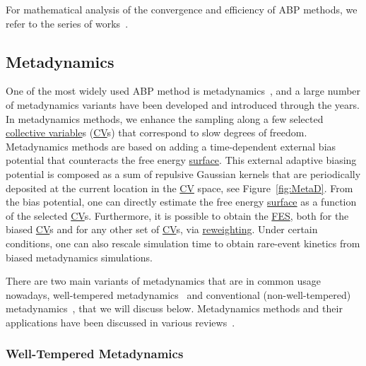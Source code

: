 \documentclass[9pt,review]{livecoms}
\begin{document}
For mathematical analysis of the convergence and efficiency of ABP methods, we refer to the series of works~\cite{fort-jourdain-lelievre-stoltz-18,fort-jourdain-kuhn-lelievre-stoltz-15,fort-jourdain-kuhn-lelievre-stoltz-14,fort-jourdain-lelievre-stoltz-17}.


\subsection{Metadynamics}
One of the most widely used ABP method is metadynamics~\cite{Laio-PNAS-2002,Barducci-PRL-2008,Valsson2016_ARPC_MetaD}, and a large number of metadynamics variants have been developed and introduced through the years. In metadynamics methods, we enhance the sampling along a few selected \hyperlink{ref:CV} {collective variable}s (\hyperlink{ref:CV} {CV}s) that correspond to slow degrees of freedom. Metadynamics methods are based on adding a time-dependent external bias potential that counteracts the free energy \hyperlink{ref:FES} {surface}. This external adaptive biasing potential is composed as a sum of repulsive Gaussian kernels that are periodically deposited at the current location in the \hyperlink{ref:CV} {CV} space, see Figure~\ref{fig:MetaD}. From the bias potential, one can directly estimate the free energy \hyperlink{ref:FES} {surface} as a function of the selected \hyperlink{ref:CV} {CV}s. Furthermore, it is possible to obtain the \hyperlink{ref:FES} {FES}, both for the biased \hyperlink{ref:CV} {CV}s and for any other set of \hyperlink{ref:CV} {CV}s, via \hyperlink{ref:Reweighting} {reweighting}. Under certain conditions, one can also rescale simulation time to obtain rare-event kinetics from biased metadynamics simulations.

There are two main variants of metadynamics that are in common usage nowadays, well-tempered metadynamics~\cite{Barducci-PRL-2008} and conventional (non-well-tempered) metadynamics~\cite{Laio-PNAS-2002}, that we will discuss below. Metadynamics methods and their applications have been discussed in various reviews~\cite{Barducci-WIREsCMS-2011,10.1080/08927022.2014.923574,10.1107/s2052252514027626,Valsson2016_ARPC_MetaD,10.1007/978-1-4939-9608-7_8,Bussi2020,BussiLaio_ReviewMetaD_2020}.

\subsubsection{Well-Tempered Metadynamics}
\end{document}
